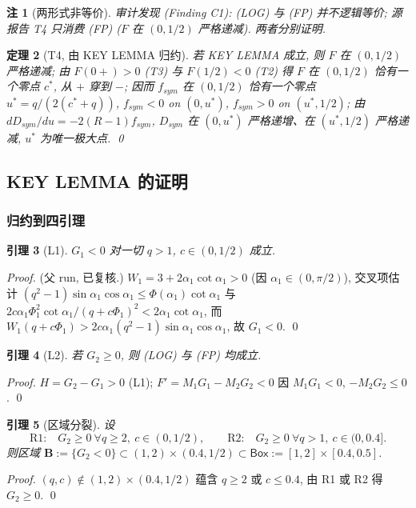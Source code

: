 \documentclass[UTF8]{ctexart}
\newtheorem{theorem}{定理}[section]
\newtheorem{lemma}[theorem]{引理}
\newtheorem{remark}[theorem]{注}
\begin{document}
\begin{remark}[两形式非等价]
审计发现 (Finding C1): (LOG) 与 (FP) 并不逻辑等价; 源报告 T4 只消费 (FP)
($F$ 在 $(0,1/2)$ 严格递减). 两者分别证明.
\end{remark}

\begin{theorem}[T4, 由 KEY LEMMA 归约]
\label{thm:T4}
若 KEY LEMMA 成立, 则 $F$ 在 $(0,1/2)$ 严格递减; 由 $F(0+)>0$ (T3) 与
$F(1/2)<0$ (T2) 得 $F$ 在 $(0,1/2)$ 恰有一个零点 $c^*$, 从 $+$ 穿到 $-$; 因而
$f_{sym}$ 在 $(0,1/2)$ 恰有一个零点 $u^*=q/(2(c^*+q))$, $f_{sym}<0$ on $(0,u^*)$,
$f_{sym}>0$ on $(u^*,1/2)$; 由 $dD_{sym}/du=-2(R-1)f_{sym}$,
$D_{sym}$ 在 $(0,u^*)$ 严格递增、在 $(u^*,1/2)$ 严格递减, $u^*$ 为唯一极大点. \qed
\end{theorem}

\subsection{KEY LEMMA 的证明}

\subsubsection{归约到四引理}
\begin{lemma}[L1]
$G_1<0$ 对一切 $q>1$, $c\in(0,1/2)$ 成立.
\end{lemma}
\begin{proof}
(父 run, 已复核.) $W_1=3+2\alpha_1\cot\alpha_1>0$ (因 $\alpha_1\in(0,\pi/2)$),
交叉项估计 $(q^2-1)\sin\alpha_1\cos\alpha_1\le\Phi(\alpha_1)\cot\alpha_1$ 与
$2c\alpha_1\Phi_1^2\cot\alpha_1/(q+c\Phi_1)^2<2\alpha_1\cot\alpha_1$, 而
$W_1(q+c\Phi_1)>2c\alpha_1(q^2-1)\sin\alpha_1\cos\alpha_1$, 故 $G_1<0$. \qed
\end{proof}

\begin{lemma}[L2]
若 $G_2\ge0$, 则 (LOG) 与 (FP) 均成立.
\end{lemma}
\begin{proof}
$H=G_2-G_1>0$ (L1); $F'=M_1G_1-M_2G_2<0$ 因 $M_1G_1<0$, $-M_2G_2\le0$. \qed
\end{proof}

\begin{lemma}[区域分裂]
设
\begin{equation}
	\text{R1:}\quad G_2\ge0\ \forall q\ge2,\ c\in(0,1/2),
	\qquad
	\text{R2:}\quad G_2\ge0\ \forall q>1,\ c\in(0,0.4].
\end{equation}
则区域 $\mathbf B:=\{G_2<0\}\subset(1,2)\times(0.4,1/2)\subset
\mathsf{Box}:=[1,2]\times[0.4,0.5]$.
\end{lemma}
\begin{proof}
$(q,c)\notin(1,2)\times(0.4,1/2)$ 蕴含 $q\ge2$ 或 $c\le0.4$, 由 R1 或 R2 得 $G_2\ge0$. \qed
\end{proof}
\end{document}
